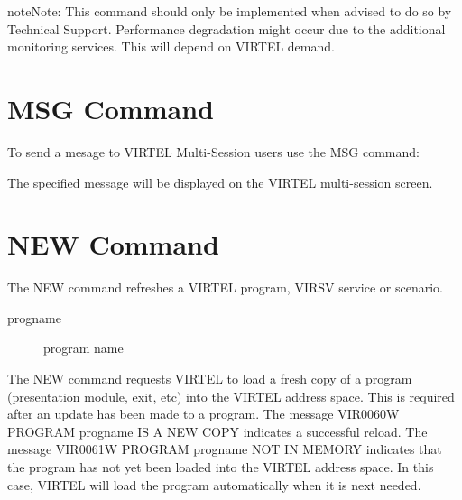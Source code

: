 \documentclass[letterpaper,10pt,english]{sphinxmanual}
\begin{document}
\begin{sphinxadmonition}{note}{Note:}
This command should only be implemented when advised to do so by Technical Support. Performance degradation might occur due to the additional monitoring services. This will depend on VIRTEL demand.
\end{sphinxadmonition}

\newpage

\ignorespaces 

\section{MSG Command}
\label{\detokenize{audit_operations_ and_performance:msg-command}}\label{\detokenize{audit_operations_ and_performance:index-14}}
To send a mesage to VIRTEL Multi-Session users use the MSG command:

\begin{sphinxVerbatim}[commandchars=\\\{\}]
 
\end{sphinxVerbatim}

The specified message will be displayed on the VIRTEL multi-session screen.

\ignorespaces 

\section{NEW Command}
\label{\detokenize{audit_operations_ and_performance:new-command}}\label{\detokenize{audit_operations_ and_performance:index-15}}
The NEW command refreshes a VIRTEL program, VIRSV service or scenario.

\begin{sphinxVerbatim}[commandchars=\\\{\}]
\end{sphinxVerbatim}
\begin{description}
\item[{progname}] \leavevmode
program name

\end{description}

The NEW command requests VIRTEL to load a fresh copy of a program  (presentation module, exit, etc) into the VIRTEL address space. This is required after an update has been made to a program. The message     VIR0060W PROGRAM progname IS A NEW COPY indicates a successful reload. The message VIR0061W PROGRAM progname NOT IN MEMORY indicates that the program has not yet been loaded into the VIRTEL address space. In this case, VIRTEL will load the program automatically when it is next needed.
\end{document}
